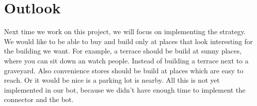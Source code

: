 \section{Outlook}
Next time we work on this project, we will focus on implementing the strategy. We would like to be able to buy and build only at places that look interesting for the building we want. For example, a terrace should be build at sunny places, where you can sit down an watch people. Instead of building a terrace next to a graveyard. Also convenience stores should be build at places which are easy to reach. Or it would be nice is a parking lot is nearby. All this is not yet implemented in our bot, because we didn't have enough time to implement the connector and the bot. 

\newpage
